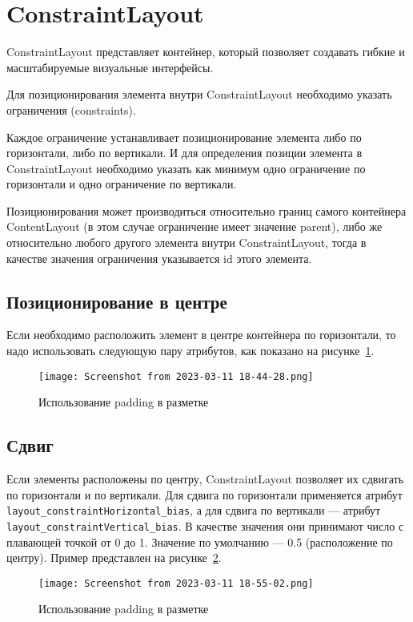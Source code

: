 \section{ConstraintLayout}
ConstraintLayout представляет контейнер, который позволяет создавать
гибкие и масштабируемые визуальные интерфейсы.\par
Для позиционирования элемента внутри ConstraintLayout необходимо указать
ограничения (constraints).\par
Каждое ограничение устанавливает позиционирование элемента либо по
горизонтали, либо по вертикали. И для определения позиции элемента в
ConstraintLayout необходимо указать как минимум одно ограничение по
горизонтали и одно ограничение по вертикали.\par
Позиционирования может производиться относительно границ самого
контейнера ContentLayout (в этом случае ограничение имеет значение parent),
либо же относительно любого другого элемента внутри ConstraintLayout,
тогда в качестве значения ограничения указывается id этого элемента.\par

\subsection{Позиционирование в центре}
Если необходимо расположить элемент в центре контейнера по горизонтали,
то надо использовать следующую пару атрибутов, как показано на
рисунке~\ref{fig:xml:pos:cent}.

\begin{figure}[h!tp]
	\centering
	\texttt{[image: Screenshot from 2023-03-11 18-44-28.png]}
	\caption{Использование padding в разметке}
	\label{fig:xml:pos:cent}
\end{figure}

\subsection{Сдвиг}
Если элементы расположены по центру, ConstraintLayout позволяет их
сдвигать по горизонтали и по вертикали. Для сдвига по горизонтали
применяется атрибут \texttt{layout\_constraintHorizontal\_bias},
а для сдвига по вертикали --- атрибут
\texttt{layout\_constraintVertical\_bias}.
В качестве значения они принимают число с плавающей точкой от 0 до 1.
Значение по умолчанию --- 0.5 (расположение по центру). Пример представлен
на рисунке~\ref{fig:xml:shift}.

\begin{figure}[h!tp]
	\centering
	\texttt{[image: Screenshot from 2023-03-11 18-55-02.png]}
	\caption{Использование padding в разметке}
	\label{fig:xml:shift}
\end{figure}

